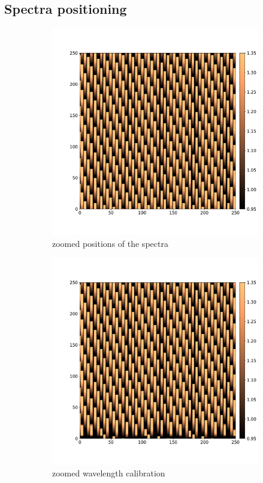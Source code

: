 \documentclass[twoside,single]{lion-msc}
\begin{document}
\subsection{Spectra positioning}
\begin{figure}[!b]
\centering
\begin{subfigure}{.5\textwidth}
  \centering
  \includegraphics[width=1\linewidth]{specpos}
  \caption{zoomed positions of the spectra}
  \label{fig:specpos}
\end{subfigure}%
\begin{subfigure}{.5\textwidth}
  \centering
  \includegraphics[width=1\linewidth]{wavecalib}
  \caption{zoomed wavelength calibration}
  \label{fig:wavecal}
\end{subfigure}
\caption{}
\end{figure}
\end{document}
